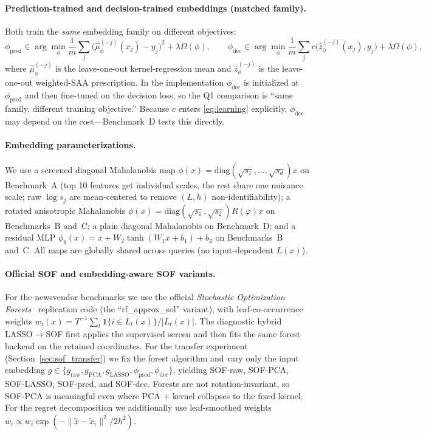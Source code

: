 \documentclass[11pt]{article}
\begin{document}
\paragraph{Prediction-trained and decision-trained embeddings (matched family).}
Both train the \emph{same} embedding family on different objectives:
\[
\phi_{\mathrm{pred}} \in \arg\min_\phi \frac{1}{m}\sum_j \bigl(\hat\mu_\phi^{(-j)}(x_j)-y_j\bigr)^2 + \lambda\Omega(\phi),
\qquad
\phi_{\mathrm{dec}} \in \arg\min_\phi \frac{1}{m}\sum_j c\bigl(\hat z_\phi^{(-j)}(x_j),y_j\bigr) + \lambda\Omega(\phi),
\]
where $\hat\mu_\phi^{(-j)}$ is the leave-one-out kernel-regression mean and $\hat z_\phi^{(-j)}$ is the leave-one-out weighted-SAA prescription. In the implementation $\phi_{\mathrm{dec}}$ is initialized at $\phi_{\mathrm{pred}}$ and then fine-tuned on the decision loss, so the Q1 comparison is ``same family, different training objective.'' Because $c$ enters \eqref{eq:learning} explicitly, $\phi_{\mathrm{dec}}$ may depend on the cost---Benchmark~D tests this directly.

\paragraph{Embedding parameterizations.}
We use a screened diagonal Mahalanobis map $\phi(x)=\mathrm{diag}(\sqrt{s_1},\dots,\sqrt{s_d})x$ on Benchmark~A (top 10 features get individual scales, the rest share one nuisance scale; raw $\log s_j$ are mean-centered to remove $(L,h)$ non-identifiability); a rotated anisotropic Mahalanobis $\phi(x)=\mathrm{diag}(\sqrt{s_1},\sqrt{s_2})R(\varphi)x$ on Benchmarks~B and~C; a plain diagonal Mahalanobis on Benchmark~D; and a residual MLP $\phi_\theta(x)=x+W_2\tanh(W_1x+b_1)+b_2$ on Benchmarks~B and~C. All maps are globally shared across queries (no input-dependent $L(x)$).

\paragraph{Official SOF and embedding-aware SOF variants.}
For the newsvendor benchmarks we use the official \emph{Stochastic Optimization Forests}~\cite{kallus2023sof} replication code (the ``rf\_approx\_sol'' variant), with leaf-co-occurrence weights $w_i(x)=T^{-1}\sum_t \mathbf 1\{i\in L_t(x)\}/|L_t(x)|$. The diagnostic hybrid LASSO$\to$SOF first applies the supervised screen and then fits the same forest backend on the retained coordinates. For the transfer experiment (Section~\ref{sec:sof_transfer}) we fix the forest algorithm and vary only the input embedding $g\in\{g_{\mathrm{raw}},g_{\mathrm{PCA}},g_{\mathrm{LASSO}},\phi_{\mathrm{pred}},\phi_{\mathrm{dec}}\}$, yielding SOF-raw, SOF-PCA, SOF-LASSO, SOF-pred, and SOF-dec. Forests are not rotation-invariant, so SOF-PCA is meaningful even where PCA + kernel collapses to the fixed kernel. For the regret decomposition we additionally use leaf-smoothed weights $\bar w_i\propto w_i\exp(-\|\tilde x-\tilde x_i\|^2/2h^2)$.
\end{document}
